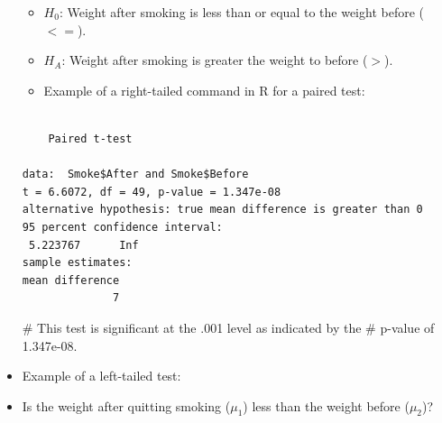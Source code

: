 \documentclass[
  letterpaper,
  DIV=11,
  numbers=noendperiod]{scrreprt}
\newenvironment{Shaded}{\begin{snugshade}}{\end{snugshade}}
\newcommand{\AttributeTok}[1]{\textcolor[rgb]{0.40,0.45,0.13}{#1}}
\newcommand{\CommentTok}[1]{\textcolor[rgb]{0.37,0.37,0.37}{#1}}
\newcommand{\ConstantTok}[1]{\textcolor[rgb]{0.56,0.35,0.01}{#1}}
\newcommand{\FunctionTok}[1]{\textcolor[rgb]{0.28,0.35,0.67}{#1}}
\newcommand{\NormalTok}[1]{\textcolor[rgb]{0.00,0.23,0.31}{#1}}
\newcommand{\SpecialCharTok}[1]{\textcolor[rgb]{0.37,0.37,0.37}{#1}}
\newcommand{\StringTok}[1]{\textcolor[rgb]{0.13,0.47,0.30}{#1}}
\providecommand{\tightlist}{%
  \setlength{\itemsep}{0pt}\setlength{\parskip}{0pt}}\usepackage{longtable,booktabs,array}
\begin{document}
\begin{itemize}
  \begin{itemize}
  \tightlist
  \item
    \(H_0\): Weight after smoking is less than or equal to the weight
    before (\(<=\)).
  \item
    \(H_A\): Weight after smoking is greater the weight to before
    (\(>\)).
  \item
    Example of a right-tailed command in R for a paired test:
  \end{itemize}

\begin{Shaded}
\end{Shaded}

\begin{verbatim}

    Paired t-test

data:  Smoke$After and Smoke$Before
t = 6.6072, df = 49, p-value = 1.347e-08
alternative hypothesis: true mean difference is greater than 0
95 percent confidence interval:
 5.223767      Inf
sample estimates:
mean difference 
              7 
\end{verbatim}

\begin{Shaded}
\begin{Highlighting}[]
\CommentTok{\# This test is significant at the .001 level as indicated by the}
\CommentTok{\# p{-}value of 1.347e{-}08.}
\end{Highlighting}
\end{Shaded}
\item
  Example of a left-tailed test:
\item
  Is the weight after quitting smoking (\(\mu_1\)) less than the weight
  before (\(\mu_2\))?


\end{itemize}
\end{document}
